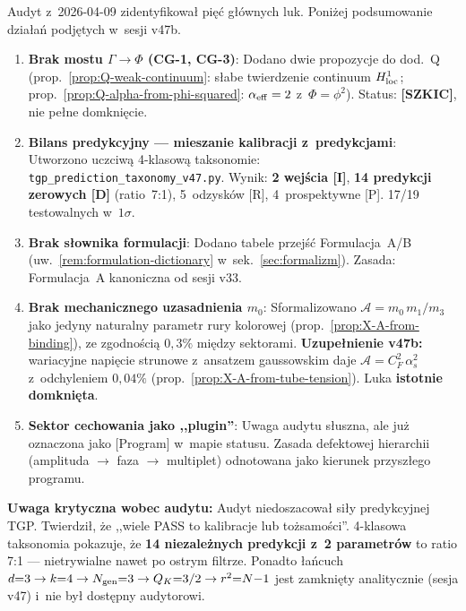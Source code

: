 \begin{remark}%
\label{rem:audit-response}
Audyt z~2026-04-09 zidentyfikowa\l{} pi\k{e}\'c g\l{}\'ownych luk.
Poni\.zej podsumowanie dzia\l{}a\'n podj\k{e}tych w~sesji v47b.

\begin{enumerate}[nosep]
  \item \textbf{Brak mostu $\Gamma \to \Phi$ (CG-1, CG-3)}:
    Dodano dwie propozycje do dod.~Q
    (prop.~\ref{prop:Q-weak-continuum}:
    s\l{}abe twierdzenie continuum $H^1_{\rm loc}$;
    prop.~\ref{prop:Q-alpha-from-phi-squared}:
    $\alpha_{\rm eff} = 2$ z~$\Phi = \phi^2$).
    Status: \textbf{[SZKIC]}, nie pe\l{}ne domkni\k{e}cie.

  \item \textbf{Bilans predykcyjny --- mieszanie kalibracji z~predykcjami}:
    Utworzono uczciw\k{a} 4-klasow\k{a} taksonomie:
    \texttt{tgp\_prediction\_taxonomy\_v47.py}.
    Wynik: \textbf{2 wej\'scia [I]},
    \textbf{14 predykcji zerowych [D]} (ratio~7:1),
    5~odzysk\'ow [R], 4~prospektywne [P].
    17/19 testowalnych w~$1\sigma$.

  \item \textbf{Brak s\l{}ownika formulacji}:
    Dodano tabele przej\'s\'c Formulacja~A/B
    (uw.~\ref{rem:formulation-dictionary} w~sek.~\ref{sec:formalizm}).
    Zasada: Formulacja~A kanoniczna od sesji v33.

  \item \textbf{Brak mechanicznego uzasadnienia $m_0$}:
    Sformalizowano $\mathcal{A} = m_0\,m_1/m_3$ jako jedyny
    naturalny parametr rury kolorowej
    (prop.~\ref{prop:X-A-from-binding}),
    ze zgodno\'sci\k{a} $0{,}3\%$ mi\k{e}dzy sektorami.
    \textbf{Uzupe\l{}nienie v47b:} wariacyjne napi\k{e}cie strunowe
    z~ansatzem gaussowskim daje
    $\mathcal{A} = C_F^2\,\alpha_s^2$ z~odchyleniem $0{,}04\%$
    (prop.~\ref{prop:X-A-from-tube-tension}).
    Luka \textbf{istotnie domkni\k{e}ta}.

  \item \textbf{Sektor cechowania jako ,,plugin''}:
    Uwaga audytu s\l{}uszna, ale ju\.z oznaczona
    jako [Program] w~mapie statusu.
    Zasada defektowej hierarchii
    (amplituda $\to$ faza $\to$ multiplet)
    odnotowana jako kierunek przysz\l{}ego programu.
\end{enumerate}

\medskip\noindent
\textbf{Uwaga krytyczna wobec audytu:}
Audyt niedoszacowa\l{} si\l{}y predykcyjnej TGP.
Twierdzi\l{}, \.ze ,,wiele PASS to kalibracje lub to\.zsamo\'sci''.
4-klasowa taksonomia pokazuje, \.ze \textbf{14 niezale\.znych
predykcji z~2 parametr\'ow} to ratio 7:1 --- nietrywialne
nawet po ostrym filtrze.
Ponadto \l{}a\'ncuch
$d{=}3 \to k{=}4 \to N_{\rm gen}{=}3 \to Q_K{=}3/2 \to r^2{=}N{-}1$
jest zamkni\k{e}ty analitycznie (sesja v47) i~nie by\l{} dost\k{e}pny
audytorowi.
\end{remark}


